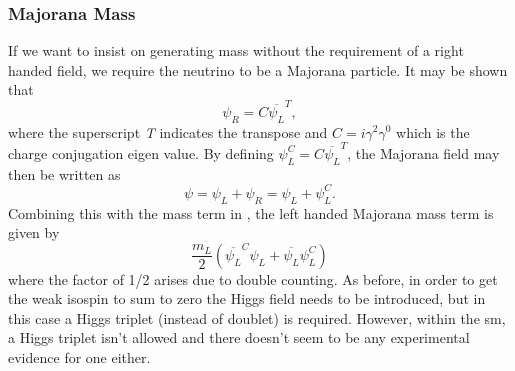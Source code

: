 \subsubsection{Majorana Mass}
If we want to insist on generating mass without the requirement of a right handed field, we require the neutrino to be a Majorana particle. It may be shown that 
\begin{equation}
    \psi_R = C\overline{\psi_L}^T,
\end{equation}
where the superscript \textit{T} indicates the transpose and $C = i \gamma^2 \gamma^0$ which is the charge conjugation eigen value. By defining $\psi_L^C = C\overline{\psi_L}^T$, the Majorana field may then be written as
\begin{equation}
    \psi = \psi_L + \psi_R = \psi_L + \psi_L^C.
\end{equation}
Combining this with the mass term in , the left handed Majorana mass term is given by 
\begin{equation}\label{eqn:Majorana mass term}
    \frac{m_L}{2}(\overline{\psi_L}^C\psi_L + \overline{\psi_L}\psi_L^C)
\end{equation}
where the factor of 1/2 arises due to double counting. As before, in order to get the weak isospin to sum to zero the Higgs field needs to be introduced, but in this case a Higgs triplet (instead of doublet) is required. However, within the \gls{sm}, a Higgs triplet isn't allowed and there doesn't seem to be any experimental evidence for one either. 


